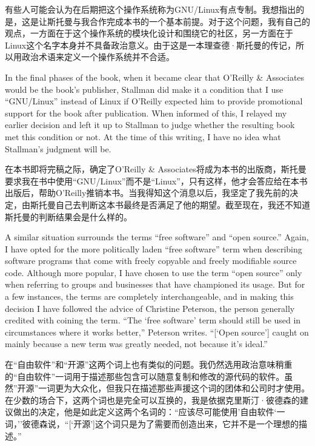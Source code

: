 \ifdefined\chs
有些人可能会认为在后期把这个操作系统称为GNU/Linux有点专制。我想指出的是，这是让斯托曼与我合作完成本书的一个基本前提。对于这个问题，我有自己的观点，一方面在于这个操作系统的模块化设计和围绕它的社区，另一方面在于Linux这个名字本身并不具备政治意义。由于这是一本理查德·斯托曼的传记，所以用政治术语来定义一个操作系统并不合适。
\fi

\ifdefined\eng
In the final phases of the book, when it became clear that O'Reilly \& Associates would be the book's publisher, Stallman did make it a condition that I use ``GNU/Linux'' instead of Linux if O'Reilly expected him to provide promotional support for the book after publication. When informed of this, I relayed my earlier decision and left it up to Stallman to judge whether the resulting book met this condition or not. At the time of this writing, I have no idea what Stallman's judgment will be.
\fi

\ifdefined\chs
在本书即将完稿之际，确定了O'Reilly \& Associates将成为本书的出版商，斯托曼要求我在书中使用``GNU/Linux''而不是``Linux''，只有这样，他才会答应给在本书出版后，帮助O'Reilly推销本书。当我得知这个消息以后，我坚定了我先前的决定，由斯托曼自己去判断这本书最终是否满足了他的期望。截至现在，我还不知道斯托曼的判断结果会是什么样的。
\fi

\ifdefined\eng
A similar situation surrounds the terms ``free software'' and ``open source.'' Again, I have opted for the more politically laden ``free software'' term when describing software programs that come with freely copyable and freely modifiable source code. Although more popular, I have chosen to use the term ``open source'' only when referring to groups and businesses that have championed its usage. But for a few instances, the terms are completely interchangeable, and in making this decision I have followed the advice of Christine Peterson, the person generally credited with coining the term. ``The `free software' term should still be used in circumstances where it works better,'' Peterson writes. ``[`Open source'] caught on mainly because a new term was greatly needed, not because it's ideal.''
\fi

\ifdefined\chs
在``自由软件''和``开源''这两个词上也有类似的问题。我仍然选用政治意味稍重的``自由软件''一词用于描述那些包含可以随意复制和修改的源代码的软件。虽然''开源''一词更为大众化，但我只在描述那些声援这个词的团体和公司时才使用。在少数的场合下，这两个词也是完全可以互换的，我是依据克里斯汀·彼德森的建议做出的决定，他是如此定义这两个名词的：``应该尽可能使用'自由软件`一词，''彼德森说，``[`开源']这个词只是为了需要而创造出来，它并不是一个理想的描述。''
\fi

\theendnotes
\setcounter{endnote}{0}

